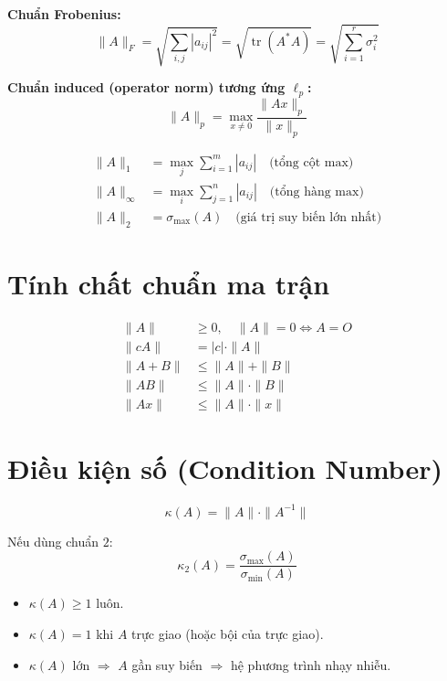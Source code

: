\textbf{Chuẩn Frobenius:}
\[
\|A\|_F = \sqrt{\sum_{i,j} |a_{ij}|^2} = \sqrt{\operatorname{tr}(A^* A)} = \sqrt{\sum_{i=1}^r \sigma_i^2}
\]

\textbf{Chuẩn induced (operator norm) tương ứng $\ell_p$:}
\[
\|A\|_p = \max_{x \neq 0} \frac{\|Ax\|_p}{\|x\|_p}
\]

\begin{align}
\|A\|_1 &= \max_j \sum_{i=1}^m |a_{ij}| \quad \text{(tổng cột max)} \\
\|A\|_\infty &= \max_i \sum_{j=1}^n |a_{ij}| \quad \text{(tổng hàng max)} \\
\|A\|_2 &= \sigma_{\max}(A) \quad \text{(giá trị suy biến lớn nhất)}
\end{align}

\section{Tính chất chuẩn ma trận}

\begin{align}
\|A\| &\ge 0, \quad \|A\| = 0 \iff A = O \\
\|cA\| &= |c| \cdot \|A\| \\
\|A + B\| &\le \|A\| + \|B\| \\
\|AB\| &\le \|A\| \cdot \|B\| \\
\|Ax\| &\le \|A\| \cdot \|x\|
\end{align}

\section{Điều kiện số (Condition Number)}

\[
\kappa(A) = \|A\| \cdot \|A^{-1}\|
\]

Nếu dùng chuẩn $2$:
\[
\kappa_2(A) = \frac{\sigma_{\max}(A)}{\sigma_{\min}(A)}
\]

\begin{itemize}
    \item $\kappa(A) \ge 1$ luôn.
    \item $\kappa(A) = 1$ khi $A$ trực giao (hoặc bội của trực giao).
    \item $\kappa(A)$ lớn $\Longrightarrow$ $A$ gần suy biến $\Longrightarrow$ hệ phương trình nhạy nhiễu.
\end{itemize}

